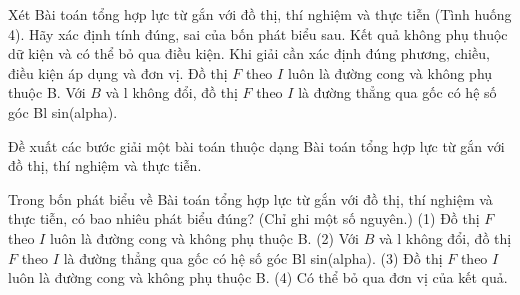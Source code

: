 \begin{ex}
Xét Bài toán tổng hợp lực từ gắn với đồ thị, thí nghiệm và thực tiễn (Tình huống 4). Hãy xác định tính đúng, sai của bốn phát biểu sau.
\choiceTF
{Kết quả không phụ thuộc dữ kiện và có thể bỏ qua điều kiện.}
{\True Khi giải cần xác định đúng phương, chiều, điều kiện áp dụng và đơn vị.}
{Đồ thị $F$ theo $I$ luôn là đường cong và không phụ thuộc B.}
{\True Với $B$ và l không đổi, đồ thị $F$ theo $I$ là đường thẳng qua gốc có hệ số góc Bl sin(alpha).}
\end{ex}

\begin{bt}
Đề xuất các bước giải một bài toán thuộc dạng Bài toán tổng hợp lực từ gắn với đồ thị, thí nghiệm và thực tiễn.
\end{bt}

\begin{ex}
Trong bốn phát biểu về Bài toán tổng hợp lực từ gắn với đồ thị, thí nghiệm và thực tiễn, có bao nhiêu phát biểu đúng? (Chỉ ghi một số nguyên.) (1) Đồ thị $F$ theo $I$ luôn là đường cong và không phụ thuộc B. (2) Với $B$ và l không đổi, đồ thị $F$ theo $I$ là đường thẳng qua gốc có hệ số góc Bl sin(alpha). (3) Đồ thị $F$ theo $I$ luôn là đường cong và không phụ thuộc B. (4) Có thể bỏ qua đơn vị của kết quả.
\end{ex}

